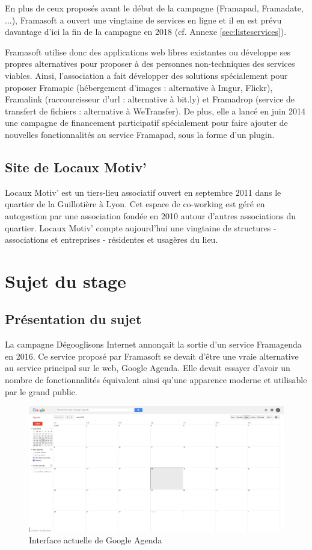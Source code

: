 \documentclass[10pt,a4paper, twoside]{report}
\begin{document}
	
	En plus de ceux proposés avant le début de la campagne (Framapad, Framadate, ...), Framasoft a ouvert une vingtaine de services en ligne et il en est prévu davantage d'ici la fin de la campagne en 2018 (cf. Annexe \ref{sec:listeservices}).
	
	Framasoft utilise donc des applications web libres existantes ou développe ses propres alternatives pour proposer à des personnes non-techniques des services viables.
	Ainsi, l'association a fait développer des solutions spécialement pour proposer Framapic (hébergement d'images : alternative à Imgur, Flickr), Framalink (raccourcisseur d'url : alternative à bit.ly) et Framadrop (service de transfert de fichiers : alternative à WeTransfer). De plus, elle a lancé en juin 2014 une campagne de financement participatif spécialement pour faire ajouter de nouvelles fonctionnalités au service Framapad, sous la forme d'un plugin.
	
	\section{Site de Locaux Motiv'}
	Locaux Motiv' est un tiers-lieu associatif ouvert en septembre 2011 dans le quartier de la Guillotière à Lyon. Cet espace de co-working est géré en autogestion par une association fondée en 2010 autour d'autres associations du quartier. Locaux Motiv' compte aujourd’hui une vingtaine de structures - associations et entreprises - résidentes et usagères du lieu.
	
	\chapter{Sujet du stage}
	
	\section{Présentation du sujet}
	
	La campagne Dégooglisons Internet annonçait la sortie d'un service Framagenda en 2016. Ce service proposé par Framasoft se devait d'être une vraie alternative au service principal sur le web, Google Agenda. Elle devait essayer d'avoir un nombre de fonctionnalités équivalent ainsi qu'une apparence moderne et utilisable par le grand public.
	
	\begin{figure}[ht]
		\centering
		\centerline{\includegraphics[width=1.5\textwidth]{images/google-agenda-interface-actuelle.png}}
		\caption*{Interface actuelle de Google Agenda}
		\label{normal_case}
	\end{figure}
	
\end{document}
